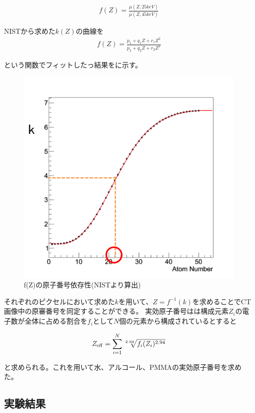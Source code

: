 \begin{align}
f(Z)=\frac{\mu(Z,25keV)}{\mu(Z,45keV)}
\end{align}

NISTから求めた$k(Z)$の曲線を
\begin{align}
f(Z)=\frac{p_1+q_1Z+r_1Z^2}{p_2+q_2Z+r_2Z^2}
\end{align}

という関数でフィットしたっ結果をに示す。

\begin{figure}[H]
 \begin{center}
 \includegraphics[bb=0.000000 0.000000 270.217662 258.218654,width=0.5\hsize]{image2/chapter5/k-Z.png} 
 \end{center}
 \caption{f(Z)の原子番号依存性(NISTより算出)}
 \label{fig:k_Z}
\end{figure}

それぞれのピクセルにおいて求めた$k$を用いて、$Z=f^{-1}(k)$を求めることでCT画像中の原審番号を同定することができる。
実効原子番号はは構成元素$Z_i$の電子数が全体に占める割合を$f_i$として$N$個の元素から構成されているとすると

\begin{align}
Z_{\rm eff}=\displaystyle\sum_{i=1}^{N}\sqrt[2.94]{f_i(Z_i)^{2.94}}
\end{align}

と求められる。これを用いて水、アルコール、PMMAの実効原子番号を求めた。

\subsection{実験結果}

